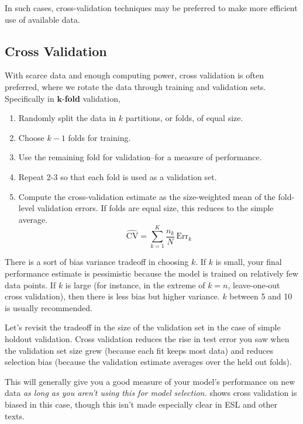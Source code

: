 In such cases, cross-validation techniques may be preferred to make more efficient use of available data.


\subsection{Cross Validation}

With scarce data and enough computing power, cross validation is often preferred, where we rotate the data through training and validation sets. Specifically in $\mathbf{k}$-\textbf{fold} validation,

\begin{enumerate}
\item Randomly split the data in $k$ partitions, or folds, of equal size.
\item Choose $k-1$ folds for training.
\item Use the remaining fold for validation--for a measure of performance.
\item Repeat 2-3 so that each fold is used as a validation set.
\item Compute the cross-validation estimate as the size-weighted mean of the fold-level validation errors. If folds are equal size, this reduces to the simple average.
\begin{equation}
\widehat{\mathrm{CV}}=\sum_{k=1}^K \frac{n_k}{N}\,\mathrm{Err}_k
\label{eq:cross-validation}
\end{equation}
\end{enumerate}

There is a sort of bias variance tradeoff in choosing $k$. If $k$ is small, your final performance estimate is pessimistic because the model is trained on relatively few data points. If $k$ is large (for instance, in the extreme of $k=n$, leave-one-out cross validation), then there is less bias but higher variance. $k$ between 5 and 10 is usually recommended.
   
Let's revisit the tradeoff in the size of the validation set in the case of simple holdout validation. 
Cross validation reduces the rise in test error you saw when the validation set size grew (because each fit keeps most data) and 
reduces selection bias (because the validation estimate averages over the held out folds).

This will generally give you a good measure of your model's performance on new data \textit{as long as you aren't using this for model selection.} \cite{varma2006bias} shows cross validation is biased in this case, though this isn't made especially clear in ESL and other texts.

